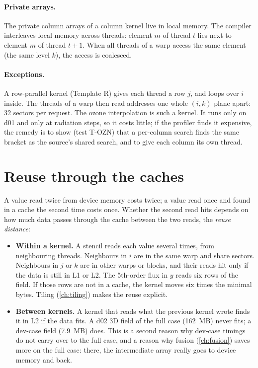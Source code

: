 \paragraph{Private arrays.} The private column arrays of a column kernel live in local memory. The compiler
interleaves local memory across threads: element $m$ of thread $t$ lies next to element $m$ of thread $t+1$. When all
threads of a warp access the same element (the same level $k$), the access is coalesced.

\paragraph{Exceptions.} A row-parallel kernel (Template R) gives each thread a row $j$, and loops over $i$ inside. The
threads of a warp then read addresses one whole $(i,k)$ plane apart: 32 sectors per request. The ozone interpolation
is such a kernel. It runs only on d01 and only at radiation steps, so it costs little; if the profiler finds it
expensive, the remedy is to show (test T-OZN) that a per-column search finds the same bracket as the source's shared
search, and to give each column its own thread.

\section{Reuse through the caches}

A value read twice from device memory costs twice; a value read once and found in a cache the second time costs once.
Whether the second read hits depends on how much data passes through the cache between the two reads, the
\emph{reuse distance}:
\begin{itemize}
  \item \textbf{Within a kernel.} A stencil reads each value several times, from neighbouring threads. Neighbours in
    $i$ are in the same warp and share sectors. Neighbours in $j$ or $k$ are in other warps or blocks, and their reads
    hit only if the data is still in L1 or L2. The 5th-order flux in $y$ reads six rows of the field. If those rows
    are not in a cache, the kernel moves six times the minimal bytes. Tiling (\cref{ch:tiling}) makes the reuse
    explicit.
  \item \textbf{Between kernels.} A kernel that reads what the previous kernel wrote finds it in L2 if the data fits.
    A d02 3D field of the full case (162~MB) never fits; a dev-case field (7.9~MB) does. This is a second reason why
    dev-case timings do not carry over to the full case, and a reason why fusion (\cref{ch:fusion}) saves more on the
    full case: there, the intermediate array really goes to device memory and back.
\end{itemize}

